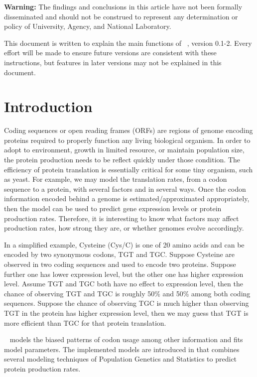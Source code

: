 
{\color{red} \bf Warning:}
The findings and conclusions in this article have not been
formally disseminated
and should not be construed to represent any determination or
policy of University, Agency, and National Laboratory.

This document is written to explain the main
functions of ~\citep{Chen2014cubfitspackage}, version 0.1-2.
Every effort will be made to ensure future versions are consistent with
these instructions, but features in later versions may not be explained
in this document.




\section[Introduction]{Introduction}
\label{sec:introduction}

Coding sequences or open reading frames (ORFs) are regions of genome encoding
proteins required to properly function any living biological organism.
In order to adopt to environment, growth in limited resource, or
maintain population size, the protein production needs to be reflect quickly
under those condition. The efficiency of protein translation is essentially
critical for some tiny organism, such as yeast.
For example, we may model the translation rates,
from a codon sequence to a protein,
with several factors and in several ways.
Once the codon information
encoded behind a genome is estimated/approximated appropriately, then
the model can be used to predict gene expression levels or protein production
rates. Therefore, it is interesting
to know what factors may affect production rates, how strong they are, or
whether genomes evolve accordingly.

In a simplified example, Cysteine (Cys/C) is one of 20 amino acids and
can be encoded by two synonymous codons, TGT and TGC. Suppose Cysteine are
observed in two coding sequences and used to encode two proteins.
Suppose further one has lower expression level, but the other one has higher
expression level. Assume TGT and TGC both have no effect to expression level,
then the chance of observing TGT and TGC is roughly 50\% and 50\% among
both coding sequences. Suppose the chance of observing TGC is much higher
than observing TGT in the protein has higher expression level, then we
may guess that TGT is more efficient than TGC for that protein translation.

~\citep{Chen2014cubfitspackage} models the biased patterns of codon usage among other
information and fits model parameters. The implemented models are introduced
in \citep{Gilchrist2007,Shah2011,Wallace2013}
that combines several
modeling techniques of Population Genetics and Statistics to
predict protein production rates.

